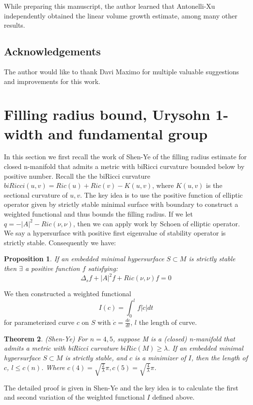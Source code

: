 \documentclass{amsart}
\newtheorem{theorem}{Theorem}[section]
\newtheorem{proposition}[theorem]{Proposition}
\theoremstyle{definition}
\theoremstyle{remark}
\numberwithin{equation}{section}
\begin{document}
While preparing this manuscript, the author learned that Antonelli-Xu \cite{gk24} independently obtained the linear volume growth estimate, among many other results.  




\subsection*{Acknowledgements}The author would like to thank Davi Maximo for multiple valuable suggestions and improvements for this work. 

\section{Filling radius bound, Urysohn 1-width and fundamental group}
In this section we first recall the work of Shen-Ye \cite{sr96} of the filling radius estimate for closed n-manifold that admits a metric with biRicci curvature bounded below by positive number. Recall the the biRicci curvature $biRicci(u,v)=Ric(u)+Ric(v)-K(u,v)$, where $K(u,v)$ is the sectional curvature of $u,v$. The key idea is to use the positive function of elliptic operator given by strictly stable minimal surface with boundary to construct a weighted functional and thus bounds the filling radius. If we let $q=-|A|^{2}-Ric(\nu,\nu)$, then we can apply work by Schoen of elliptic operator. We say a hypersurface with positive first eigenvalue of stability operator is strictly stable. Consequently we have:
\begin{proposition}
    If an embedded minimal hypersurface $S\subset M$ is strictly stable then $\exists$ a positive function $f$ satisfying:
\begin{equation}
    \Delta_{s}f+|A|^{2}f+Ric(\nu,\nu)f=0
\end{equation}
\end{proposition}
We then constructed a weighted functional\\
\begin{equation}
    I(c)=\int_{0}^{l}f|\dot{c}|dt
\end{equation}
for parameterized curve $c$ on $S$ with $\dot{c}=\frac{dc}{dt}$, $l$ the length of curve.
\begin{theorem}(Shen-Ye\cite{sr96})
  For $n=4,5$, suppose M is a (closed) n-manifold that admits a metric with biRicci curvature $biRic(M)\geq \lambda$. If an embedded minimal hypersurface $S\subset M$ is strictly stable, and $c$ is a minimizer of $I$, then the length of $c$, $l\leq c(n)$. Where $c(4)=\sqrt{\frac{2}{\lambda}}\pi, c(5)=\sqrt{\frac{4}{\lambda}}\pi$.
 \end{theorem}
The detailed proof is given in Shen-Ye\cite{sr96} and the key idea is to calculate the first and second variation of the weighted functional $I$ defined above. \\
\end{document}
